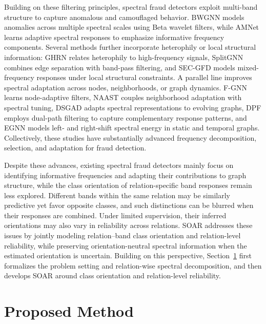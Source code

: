 \documentclass[10pt,journal]{IEEEtran}
\begin{document}
Building on these filtering principles, spectral fraud detectors exploit multi-band structure to capture anomalous and camouflaged behavior. BWGNN \cite{tang2022bwgnn} models anomalies across multiple spectral scales using Beta wavelet filters, while AMNet \cite{chai2022amnet} learns adaptive spectral responses to emphasize informative frequency components. Several methods further incorporate heterophily or local structural information: GHRN \cite{gao2023ghrn} relates heterophily to high-frequency signals, SplitGNN \cite{wu2023splitgnn} combines edge separation with band-pass filtering, and SEC-GFD \cite{xu2024secgfd} models mixed-frequency responses under local structural constraints. A parallel line improves spectral adaptation across nodes, neighborhoods, or graph dynamics. F-GNN \cite{zhao2026fgnn} learns node-adaptive filters, NAAST \cite{guo2024naast} couples neighborhood adaptation with spectral tuning, DSGAD \cite{zheng2025dsgad} adapts spectral representations to evolving graphs, DPF \cite{he2026dpf} employs dual-path filtering to capture complementary response patterns, and EGNN \cite{liu2026egnn} models left- and right-shift spectral energy in static and temporal graphs. Collectively, these studies have substantially advanced frequency decomposition, selection, and adaptation for fraud detection.

Despite these advances, existing spectral fraud detectors mainly focus on identifying informative frequencies and adapting their contributions to graph structure, while the class orientation of relation-specific band responses remain less explored. Different bands within the same relation may be similarly predictive yet favor opposite classes, and such distinctions can be blurred when their responses are combined. Under limited supervision, their inferred orientations may also vary in reliability across relations. SOAR addresses these issues by jointly modeling relation--band class orientation and relation-level reliability, while preserving orientation-neutral spectral information when the estimated orientation is uncertain. Building on this perspective, Section~\ref{sec:method} first formalizes the problem setting and relation-wise spectral decomposition, and then develops SOAR around class orientation and relation-level reliability.

\section{Proposed Method}
\label{sec:method}
\end{document}
